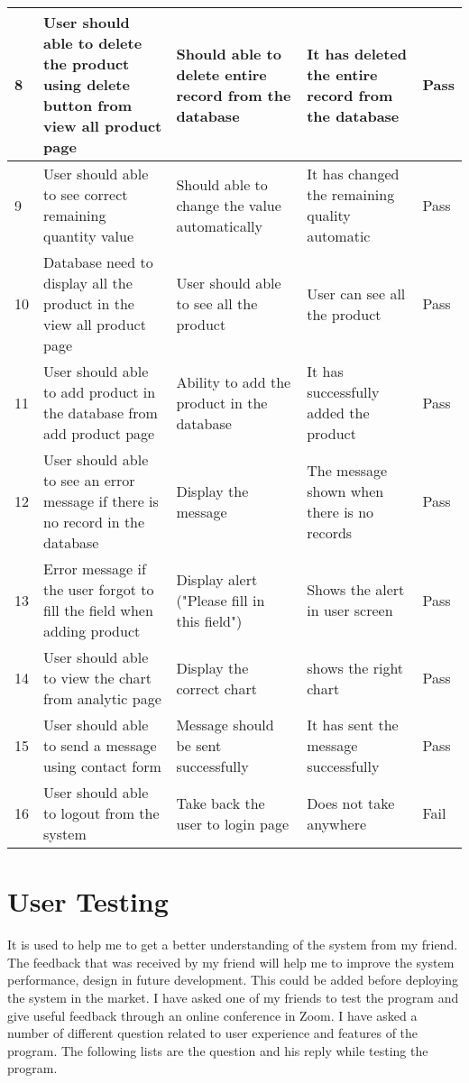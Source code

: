 \begin{longtable}{| p{4em} | p{9em}| p{9em} |  p{9em} |  p{4em} | }
\hline
8 & User should able to delete the product using delete button from view all product page  & Should able to delete entire record from the database & It has deleted the entire record from the database & Pass \\

\hline
9 & User should able to see correct remaining quantity value & Should able to change the value automatically & It has changed the remaining quality automatic & Pass \\

\hline
10 & Database need to display all the product in the view all product page  & User should able to see all the product & User can see all the product & Pass \\

\hline
11 & User should able to add product in the database from add product page  & Ability to add the product in the database & It has successfully added the product & Pass \\

\hline
12 & User should able to see an error message if there is no record in the database & Display the message & The message shown when there is no records & Pass \\

\hline
13 & Error message if the user forgot to fill the field when adding product & Display alert ("Please fill in this field") & Shows the alert in user screen & Pass \\

\hline
14 & User should able to view the chart from analytic page & Display the correct chart & shows the right chart & Pass \\

\hline
15 & User should able to send a message using contact form & Message should be sent successfully  & It has sent the message successfully & Pass \\

\hline
16 & User should able to logout from the system  & Take back the user to login page & Does not take anywhere & Fail \\

\end{longtable}

\section{User Testing}
It is used to help me to get a better understanding of the system from my friend. The feedback that was received by my friend will help me to improve the system performance, design in future development. This could be added before deploying the system in the market. I have asked one of my friends to test the program and give useful feedback through an online conference in Zoom. I have asked a number of different question related to user experience and features of the program.\newline 
\newline The following lists are the question and his reply while testing the program.

